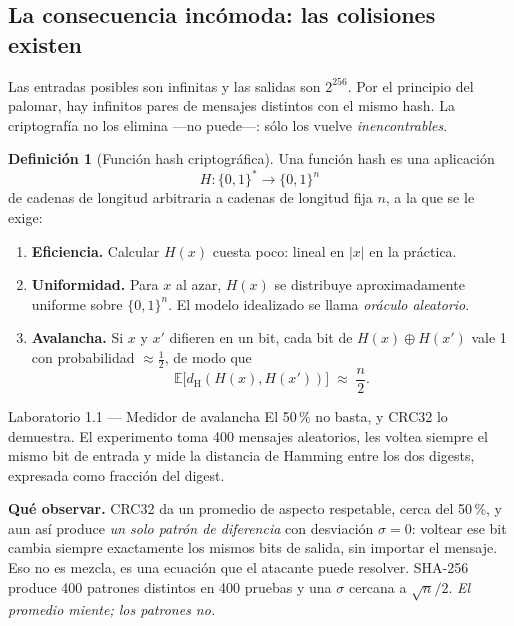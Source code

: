 \documentclass[11pt,a4paper]{article}
\theoremstyle{definition}
\newtheorem{definicion}{Definición}
\theoremstyle{plain}
\theoremstyle{remark}
\newcommand{\bits}{\{0,1\}}
\newcommand{\dH}{d_{\mathrm{H}}}
\begin{document}
\subsection{La consecuencia incómoda: las colisiones existen}

Las entradas posibles son infinitas y las salidas son $2^{256}$. Por el
principio del palomar, hay infinitos pares de mensajes distintos con el mismo
hash. La criptografía no los elimina ---no puede---: sólo los vuelve
\emph{inencontrables}.

\begin{definicion}[Función hash criptográfica]
Una función hash es una aplicación
\[
  H : \bits^{*} \longrightarrow \bits^{n}
\]
de cadenas de longitud arbitraria a cadenas de longitud fija $n$, a la que se le
exige:
\begin{enumerate}[label=(\roman*),leftmargin=2.2em,itemsep=0.2em]
  \item \textbf{Eficiencia.} Calcular $H(x)$ cuesta poco: lineal en $|x|$ en la
    práctica.
  \item \textbf{Uniformidad.} Para $x$ al azar, $H(x)$ se distribuye
    aproximadamente uniforme sobre $\bits^{n}$. El modelo idealizado se llama
    \emph{oráculo aleatorio}.
  \item \textbf{Avalancha.} Si $x$ y $x'$ difieren en un bit, cada bit de
    $H(x)\oplus H(x')$ vale 1 con probabilidad $\approx \tfrac12$, de modo que
    \[
      \mathbb{E}\bigl[\dH(H(x),H(x'))\bigr] \;\approx\; \frac{n}{2}.
    \]
\end{enumerate}
\end{definicion}

\begin{laboratorio}{Laboratorio 1.1 — Medidor de avalancha}
El 50\,\% no basta, y CRC32 lo demuestra. El experimento toma 400 mensajes
aleatorios, les voltea siempre el mismo bit de entrada y mide la distancia de
Hamming entre los dos digests, expresada como fracción del digest.

\textbf{Qué observar.} CRC32 da un promedio de aspecto respetable, cerca del
50\,\%, y aun así produce \emph{un solo patrón de diferencia} con desviación
$\sigma = 0$: voltear ese bit cambia siempre exactamente los mismos bits de
salida, sin importar el mensaje. Eso no es mezcla, es una ecuación que el
atacante puede resolver. SHA-256 produce 400 patrones distintos en 400 pruebas y
una $\sigma$ cercana a $\sqrt{n}/2$. \emph{El promedio miente; los patrones no.}
\end{laboratorio}
\end{document}
